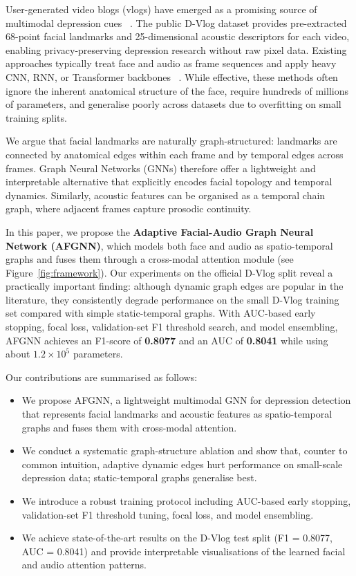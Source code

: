 \documentclass[conference]{IEEEtran}
\begin{document}
User-generated video blogs (vlogs) have emerged as a promising source of multimodal depression cues~
\cite{yoon2022dvlog}.
The public D-Vlog dataset provides pre-extracted 68-point facial landmarks and 25-dimensional acoustic descriptors for each video, enabling privacy-preserving depression research without raw pixel data.
Existing approaches typically treat face and audio as frame sequences and apply heavy CNN, RNN, or Transformer backbones~
\cite{zhou2023tamfn,tao2024depmstat,hua2026asym}.
While effective, these methods often ignore the inherent anatomical structure of the face, require hundreds of millions of parameters, and generalise poorly across datasets due to overfitting on small training splits.

We argue that facial landmarks are naturally graph-structured: landmarks are connected by anatomical edges within each frame and by temporal edges across frames.
Graph Neural Networks (GNNs) therefore offer a lightweight and interpretable alternative that explicitly encodes facial topology and temporal dynamics.
Similarly, acoustic features can be organised as a temporal chain graph, where adjacent frames capture prosodic continuity.

In this paper, we propose the \textbf{Adaptive Facial-Audio Graph Neural Network (AFGNN)}, which models both face and audio as spatio-temporal graphs and fuses them through a cross-modal attention module (see Figure~\ref{fig:framework}).
Our experiments on the official D-Vlog split reveal a practically important finding: although dynamic graph edges are popular in the literature, they consistently degrade performance on the small D-Vlog training set compared with simple static-temporal graphs.
With AUC-based early stopping, focal loss, validation-set F1 threshold search, and model ensembling, AFGNN achieves an F1-score of \textbf{0.8077} and an AUC of \textbf{0.8041} while using about $1.2\times10^5$ parameters.

Our contributions are summarised as follows:
\begin{itemize}
    \item We propose AFGNN, a lightweight multimodal GNN for depression detection that represents facial landmarks and acoustic features as spatio-temporal graphs and fuses them with cross-modal attention.
    \item We conduct a systematic graph-structure ablation and show that, counter to common intuition, adaptive dynamic edges hurt performance on small-scale depression data; static-temporal graphs generalise best.
    \item We introduce a robust training protocol including AUC-based early stopping, validation-set F1 threshold tuning, focal loss, and model ensembling.
    \item We achieve state-of-the-art results on the D-Vlog test split (F1 = 0.8077, AUC = 0.8041) and provide interpretable visualisations of the learned facial and audio attention patterns.
\end{itemize}
\end{document}
